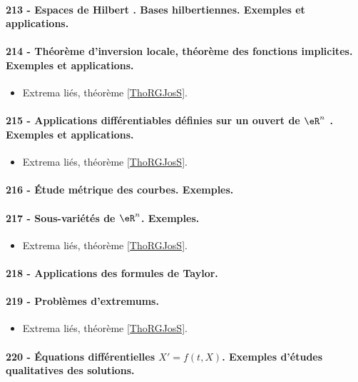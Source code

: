\paragraph{213 - Espaces de Hilbert . Bases hilbertiennes. Exemples et applications.}
\paragraph{214 - Théorème d’inversion locale, théorème des fonctions implicites. Exemples et applications.}
\begin{itemize}
    \item Extrema liés, théorème \ref{ThoRGJosS}.
\end{itemize}
\paragraph{215 - Applications différentiables définies sur un ouvert de $\eR^n$ . Exemples et applications.}
\begin{itemize}
    \item Extrema liés, théorème \ref{ThoRGJosS}.
\end{itemize}
\paragraph{216 - Étude métrique des courbes. Exemples.}
\paragraph{217 - Sous-variétés de \( \eR^n\). Exemples.}
\begin{itemize}
    \item Extrema liés, théorème \ref{ThoRGJosS}.
\end{itemize}
\paragraph{218 - Applications des formules de Taylor.}
\paragraph{219 - Problèmes d’extremums.}
\begin{itemize}
    \item Extrema liés, théorème \ref{ThoRGJosS}.
\end{itemize}
\paragraph{220 - Équations différentielles $X' = f (t , X )$. Exemples d’études qualitatives des solutions.}
